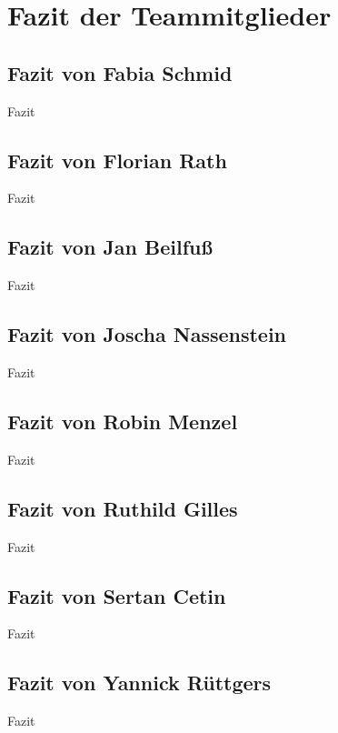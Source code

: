 \section{Fazit der Teammitglieder}
\label{instal}

\subsection{Fazit von Fabia Schmid}

Fazit

\subsection{Fazit von Florian Rath}

Fazit

\subsection{Fazit von Jan Beilfuß}

Fazit

\subsection{Fazit von Joscha Nassenstein}

Fazit

\subsection{Fazit von Robin Menzel}

Fazit

\subsection{Fazit von Ruthild Gilles}

Fazit

\subsection{Fazit von Sertan Cetin}

Fazit

\subsection{Fazit von Yannick Rüttgers}

Fazit


